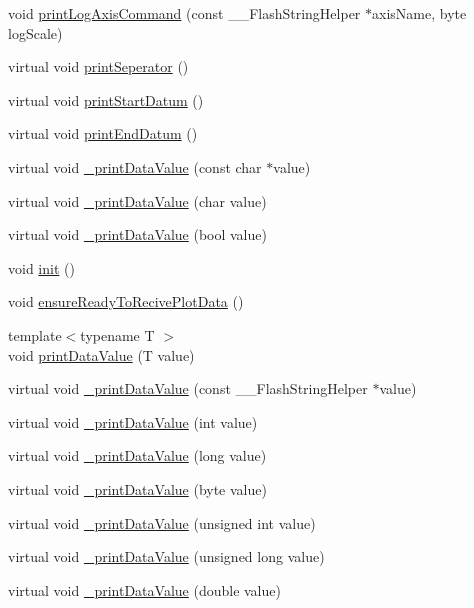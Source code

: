 \begin{DoxyCompactItemize}
void \hyperlink{class_g_n_u_plot_base_ad7e8ef8d8e5eb80119fc0cce9be2d525}{print\+Log\+Axis\+Command} (const \+\_\+\+\_\+\+Flash\+String\+Helper $\ast$axis\+Name, byte log\+Scale)
\item 
virtual void \hyperlink{class_g_n_u_plot_base_ae204818b4e8dcd9d2f6b5426127ca2cf}{print\+Seperator} ()
\item 
virtual void \hyperlink{class_g_n_u_plot_base_ac2b48b822b6043392b514c9580b1661a}{print\+Start\+Datum} ()
\item 
virtual void \hyperlink{class_g_n_u_plot_base_aff02bc279e6c3cb83f2cdc7aa021268f}{print\+End\+Datum} ()
\item 
virtual void \hyperlink{class_g_n_u_plot_base_ad00a12fd681e4638fae005891fd72f38}{\+\_\+print\+Data\+Value} (const char $\ast$value)
\item 
virtual void \hyperlink{class_g_n_u_plot_base_aa6c6dfff0568dd99c0c28081c41b4433}{\+\_\+print\+Data\+Value} (char value)
\item 
virtual void \hyperlink{class_g_n_u_plot_base_a6f14fc040ff833c685ab09fc7917e059}{\+\_\+print\+Data\+Value} (bool value)
\item 
void \hyperlink{class_serial_graph_a760dd00474c9780c81ece7cdf621fc15}{init} ()
\item 
void \hyperlink{class_serial_graph_abd43150abedec26eef3994cd33035173}{ensure\+Ready\+To\+Recive\+Plot\+Data} ()
\item 
{\footnotesize template$<$typename T $>$ }\\void \hyperlink{class_serial_graph_a91e20c05c8cc612fd9ffd85880149264}{print\+Data\+Value} (T value)
\item 
virtual void \hyperlink{class_serial_graph_a0c4d2c1239de3107d7332389183b05a1}{\+\_\+print\+Data\+Value} (const \+\_\+\+\_\+\+Flash\+String\+Helper $\ast$value)
\item 
virtual void \hyperlink{class_serial_graph_a58edf4683c600b6bfa1714b0f8dfc82c}{\+\_\+print\+Data\+Value} (int value)
\item 
virtual void \hyperlink{class_serial_graph_a9a4903d4fa26bb85ba5dd93c4365bcc2}{\+\_\+print\+Data\+Value} (long value)
\item 
virtual void \hyperlink{class_serial_graph_acada5333b96b65e31d8c76c3ab22905f}{\+\_\+print\+Data\+Value} (byte value)
\item 
virtual void \hyperlink{class_serial_graph_acd91cf0c3a0f49d4bdf18b447503da23}{\+\_\+print\+Data\+Value} (unsigned int value)
\item 
virtual void \hyperlink{class_serial_graph_a6dbfe61ee398e18c1b752a3748df9663}{\+\_\+print\+Data\+Value} (unsigned long value)
\item 
virtual void \hyperlink{class_serial_graph_a766d5838ede9c8fa998ce8664e5f92be}{\+\_\+print\+Data\+Value} (double value)
\end{DoxyCompactItemize}
